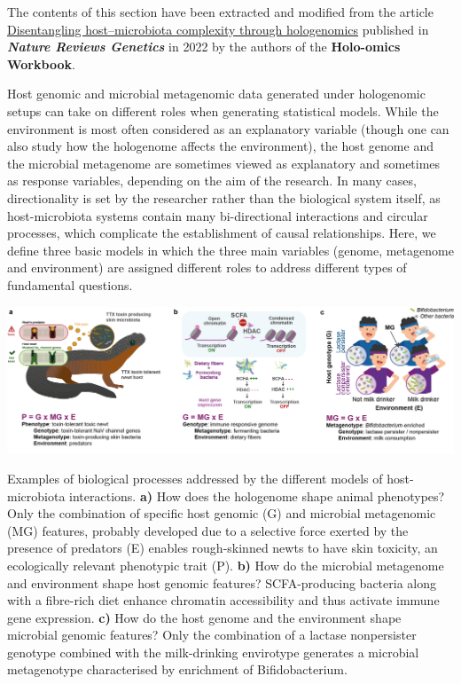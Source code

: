 \documentclass[
]{book}
\begin{document}
The contents of this section have been extracted and modified from the article \href{https://www.nature.com/articles/s41576-021-00421-0}{Disentangling host--microbiota complexity through hologenomics} published in \textbf{\emph{Nature Reviews Genetics}} in 2022 by the authors of the \textbf{Holo-omics Workbook}.

Host genomic and microbial metagenomic data generated under hologenomic setups can take on different roles when generating statistical models. While the environment is most often considered as an explanatory variable (though one can also study how the hologenome affects the environment), the host genome and the microbial metagenome are sometimes viewed as explanatory and sometimes as response variables, depending on the aim of the research. In many cases, directionality is set by the researcher rather than the biological system itself, as host-microbiota systems contain many bi-directional interactions and circular processes, which complicate the establishment of causal relationships. Here, we define three basic models in which the three main variables (genome, metagenome and environment) are assigned different roles to address different types of fundamental questions.

\includegraphics{images/hologenomics_response_variables.png}

Examples of biological processes addressed by the different models of host-microbiota interactions. \textbf{a)} How does the hologenome shape animal phenotypes? Only the combination of specific host genomic (G) and microbial metagenomic (MG) features, probably developed due to a selective force exerted by the presence of predators (E) enables rough-skinned newts to have skin toxicity, an ecologically relevant phenotypic trait (P). \textbf{b)} How do the microbial metagenome and environment shape host genomic features? SCFA-producing bacteria along with a fibre-rich diet enhance chromatin accessibility and thus activate immune gene expression. \textbf{c)} How do the host genome and the environment shape microbial genomic features? Only the combination of a lactase nonpersister genotype combined with the milk-drinking envirotype generates a microbial metagenotype characterised by enrichment of Bifidobacterium.
\end{document}
